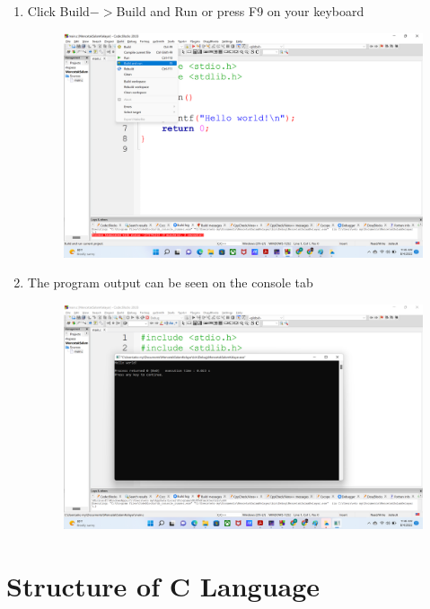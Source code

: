 \begin{enumerate}
\begin{figure}[H]
		      \caption{}
		      \label{fig:screenshot008}
	      \end{figure}
	\item Click Build$->$Build and Run or press F9 on your keyboard
	      \begin{figure}[H]
		      \centering
		      \includegraphics[width=0.7\linewidth]{P1/img/screenshot009.png}
		      \caption{}
		      \label{fig:screenshot009}
	      \end{figure}
	\item The program output can be seen on the console tab
	      \begin{figure}[H]
		      \centering
		      \includegraphics[width=0.7\linewidth]{P1/img/screenshot010.png}
		      \caption{}
		      \label{fig:screenshot010}
	      \end{figure}
\end{enumerate}

\section{Structure of C Language}

